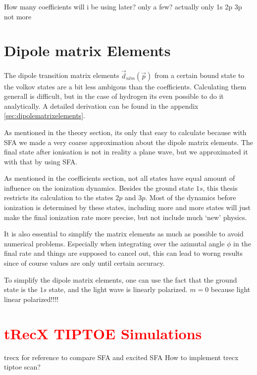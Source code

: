 \bigskip
How many coefficients will i be using later? only a few? actually only 1s 2p 3p not more


\section{Dipole matrix Elements}
The dipole transition matrix elements $\vec{d}_{nlm}(\vec{p})$ from a certain bound state to the volkov states are a bit less ambigous than the coefficients.
Calculating them generall is difficult, but in the case of hydrogen its even possible to do it analytically.
A detailed derivation can be found in the appendix \ref{sec:dipolematrixelements}.


As mentioned in the theory section, its only that easy to calculate because with SFA we made a very coarse approximation about the dipole matrix elements.
The final state after ionisation is not in reality a plane wave, but we approximated it with that by using SFA.

As mentioned in the coefficients section, not all states have equal amount of influence on the ionization dynamics.
Besides the ground state $1s$, this thesis restricts its calculation to the states $2p$ and $3p$.
Most of the dynamics before ionization is determined by these states, including more and more states will just make the final ionization rate more precise, but not include much `new' physics.

It is also essential to simplify the matrix elements as much as possible to avoid numerical problems.
Especially when integrating over the azimutal angle $\phi$ in the final rate and things are supposed to cancel out, this can lead to worng results since of course values are only until certain accuracy.

To simplify the dipole matrix elements, one can use the fact that the ground state is the $1s$ state, and the light wave is linearly polarized.
$m=0$ because light linear polarized!!!!



\section{\textcolor{red}{tRecX TIPTOE Simulations}}
trecx for reference to compare SFA and excited SFA
How to implement trecx tiptoe scan?

